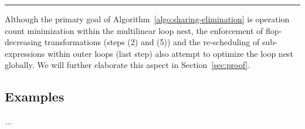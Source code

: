 \noindent\rule[1.0ex]{\linewidth}{0.7pt}

Although the primary goal of Algorithm~\ref{algo:sharing-elimination} is operation count minimization within the multilinear loop nest, the enforcement of flop-decreasing transformations (steps (2) and (5)) and the re-scheduling of sub-expressions within outer loops (last step) also attempt to optimize the loop nest globally. We will further elaborate this aspect in Section~\ref{sec:proof}.


\subsection{Examples}
\label{sec:se-examples}
...
%


